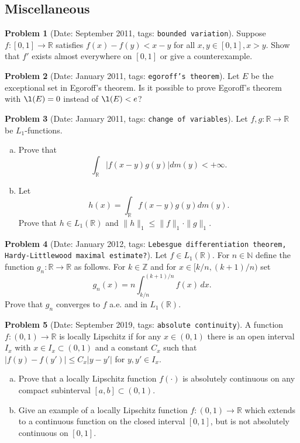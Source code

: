 \documentclass[11pt, notitlepage]{article}
\theoremstyle{definition}
\theoremstyle{definition}
\theoremstyle{definition}
\newtheorem{probstate}{Problem}
\theoremstyle{remark}
\newenvironment{problem}[2]{
    \begin{probstate}[Date: #1, tags: {\color{white} \texttt{#2}}]
}
{
  \end{probstate}
}
\newcommand{\R}{\mathbb{R}}
\newcommand{\Z}{\mathbb{Z}}
\newcommand{\N}{\mathbb{N}}
\begin{document}
\subsection{Miscellaneous}

\begin{problem}{September 2011}{bounded variation}
  Suppose $f:[0,1] \to \R$ satisfies $f(x)-f(y)<x-y$ for all $x,y\in [0,1], x>y$.
  Show that $f'$ exists almost everywhere on $[0,1]$ or give a counterexample.
\end{problem}


\begin{problem}{January 2011}{egoroff's theorem}
  Let $E$ be the exceptional set in Egoroff's theorem.
    Is it possible to prove Egoroff's theorem with
    $\l(E)=0$ instead of $\l(E) < e$?
\end{problem}


\begin{problem}{January 2011}{change of variables}
  Let $f,g: \mathbb R \rightarrow \mathbb R$ be $L_1$-functions.
  \begin{enumerate}[(a)]
\item Prove that
\[
\int_{\mathbb R} |f(x-y)g(y)| dm(y) < +\infty.
\]
  \item Let
\[
h(x)= \int_{\mathbb R} f(x-y)g(y) dm(y).
\]
Prove that $h \in L_1(\mathbb R)$ and $\|h\|_1 \le \|f\|_1 \cdot \|g\|_1$.
\end{enumerate}
\end{problem}

\begin{problem}{January 2012}{Lebesgue differentiation theorem, Hardy-Littlewood maximal estimate?}
  Let  $f \in L_1(\R)$.
  For $n \in \N$ define the function $g_n: \R \to \R$ as follows.  For $k \in \Z$ and for $x \in [k/n,(k+1)/n)$ set
\[
 g_n(x)=n \int_{k/n}^{(k+1)/n} f (x) \, dx.
\]
Prove that $g_n$ converges to $f$ a.e. and in $L_1(\R)$.
\end{problem}


\begin{problem}{September 2019}{absolute continuity}
   A function $f:(0,1)\to\mathbb{R}$ is locally Lipschitz if for   any $x\in(0,1)$ there is an open interval $I_x$ with $x\in I_x\subset (0,1)$ and a constant $C_x$ such that $|f(y)-f(y')|\le C_x|y-y'|$ for $y,y'\in I_x$.

\begin{enumerate}[(a)]
\item Prove that a locally Lipschitz function $f(\cdot)$ is absolutely continuous on any compact subinterval
$[a,b]\subset (0,1)$.

\item  Give an example of a locally Lipschitz function $f:(0,1)\to\mathbb{R}$ which extends to a continuous function on the closed interval $[0,1]$, but is not absolutely continuous on $[0,1]$.
\end{enumerate}
\end{problem}
\end{document}
